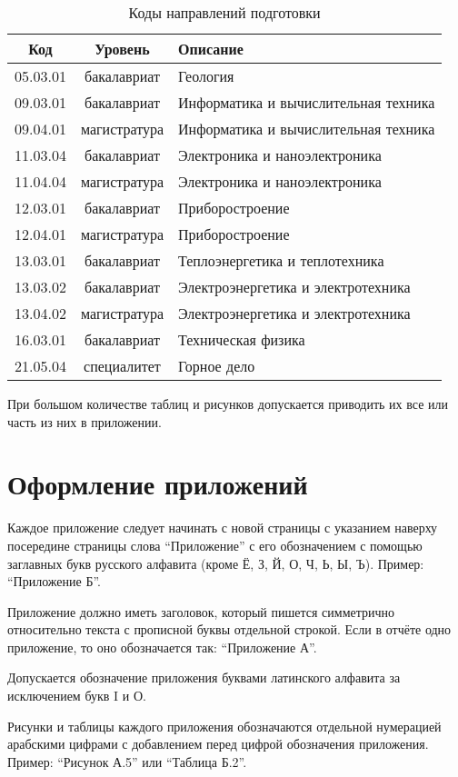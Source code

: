 \documentclass[utf8,14pt, coursreport]{G7-32}
\begin{document}
\begin{table}[h]
\caption{Коды направлений подготовки \cite{bachcodes, mastercodes}}
\begin{tabular}{|c|c|p{80mm}|}
\hline
Код & Уровень & Описание\\
\hline
05.03.01 & бакалавриат & Геология\\
09.03.01 & бакалавриат & Информатика и вычислительная техника\\
09.04.01 & магистратура & Информатика и вычислительная техника\\
11.03.04 & бакалавриат & Электроника и наноэлектроника\\
11.04.04 & магистратура & Электроника и наноэлектроника\\
12.03.01 & бакалавриат & Приборостроение\\
12.04.01 & магистратура & Приборостроение\\
13.03.01 & бакалавриат & Теплоэнергетика и теплотехника\\
13.03.02 & бакалавриат & Электроэнергетика и электротехника\\
13.04.02 & магистратура & Электроэнергетика и электротехника\\
16.03.01 & бакалавриат & Техническая физика\\
21.05.04 & специалитет & Горное дело\\
\hline
\end{tabular}
\end{table}

При большом количестве таблиц и рисунков допускается приводить их все или часть из них в приложении.

\section{Оформление приложений}

Каждое приложение следует начинать с новой страницы с указанием наверху посередине страницы слова ``Приложение'' с его обозначением с помощью заглавных букв русского алфавита (кроме Ё, З, Й, О, Ч, Ь, Ы, Ъ). Пример: ``Приложение Б''.

Приложение должно иметь заголовок, который пишется симметрично относительно текста с прописной буквы отдельной строкой. Если в отчёте одно приложение, то оно обозначается так: ``Приложение А''.

Допускается обозначение приложения буквами латинского алфавита за исключением букв I и О.

Рисунки и таблицы каждого приложения обозначаются отдельной нумерацией арабскими цифрами с добавлением перед цифрой обозначения приложения. Пример: ``Рисунок А.5'' или ``Таблица Б.2''.
\end{document}
